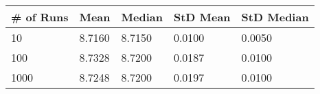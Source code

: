 
\begin{tabular}{lllll}

{\bf \# of Runs} & {\bf Mean} & {\bf Median} & 
  {\bf StD Mean} & {\bf StD Median} \\ \hline

10   & 8.7160 & 8.7150 & 0.0100 & 0.0050 \\
100  & 8.7328 & 8.7200 & 0.0187 & 0.0100 \\
1000 & 8.7248 & 8.7200 & 0.0197 & 0.0100 \\

\hline
\end{tabular}

